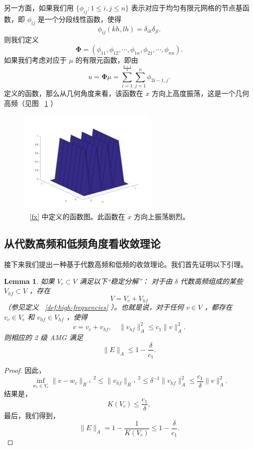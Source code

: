 \documentclass[12pt]{acta_2011xz}
\newcommand{\Tnorm}[1]{\ensuremath{\|#1\|_{\bar R^{-1}}}}
\newtheorem{lemma}[theorem]{Lemma}
\begin{document}
另一方面，如果我们用    $ \{ \phi_{ij}: 1\le i, j\le n \} $    表示对应于均匀有限元网格的节点基函数，即    $\phi_{ij}$    是一个分段线性函数，使得
   \begin{equation*}
    \phi_{ij}(kh, lh)=\delta_{ik}\delta_{jl}.
\end{equation*}    则我们定义
   \begin{equation*}
    \bm{\Phi}=(\phi_{11}, \phi_{12}, \cdots, \phi_{1n}, \phi_{21}, \cdots, \phi_{nn}).
\end{equation*}    如果我们考虑对应于    $\mu$    的有限元函数，即由
   \begin{equation}\label{fx}
    u= \bm{\Phi}\mu = \sum_{i=1}^{\frac{n+1}{2}}\sum_{j=1}^{n}\phi_{2i-1, j}.
\end{equation}    定义的函数，那么从几何角度来看，该函数在    $x$    方向上高度振荡，这是一个几何高频（见图~    \ref{f:fx}    ）  

   \begin{figure}[h]
    \centering
    \includegraphics[width=0.6\textwidth]{semicoarse}
    \caption{~    \eqref{fx}    中定义的函数图。此函数在    $x$    方向上振荡剧烈。  }
    \label{f:fx}
\end{figure}     

   \subsection{从代数高频和低频角度看收敛理论  }     

接下来我们提出一种基于代数高频和低频的收敛理论。我们首先证明以下引理。
   \begin{lemma}   \label{l:VhfVc}    如果    $V_c\subset V$    满足以下“稳定分解”：
对于由    $\delta$    代数高频组成的某些    $V_{hf}\subset V$   ，存在    $$
V=V_c+V_{hf}
$$   （参见定义~    \ref{def:high-frequencies}   ）。也就是说，对于任何    $v\in V$   ，都存在    $v_c\in V_c$    和
   $v_{hf}\in V_{hf}$   ，使得
   $$
v=v_c+v_{hf}, \quad \|v_{hf}\|_A^2\le c_1\|v\|_A^2.
$$    则相应的 2 级 AMG 满足
   $$
\|E\|_A\le 1-\frac{\delta}{c_1} .
$$     \end{lemma}   
   \begin{proof}因此，
   $$
\inf_{w_c\in V_c}\Tnorm{v-w_c}^2
\le \Tnorm{v_{hf}}^2\le \delta^{-1}\|v_{hf}\|_A^2\le 
\frac{c_1}{\delta}\|v\|_A^2.
$$    结果是，
   $$
K(V_c)\le\frac{c_1}{\delta},
$$    最后，我们得到，
   $$
\|E\|_A=1-\frac{1}{K(V_c)}\le 1-\frac{\delta}{c_1}.
$$     \end{proof}     
\end{document}
